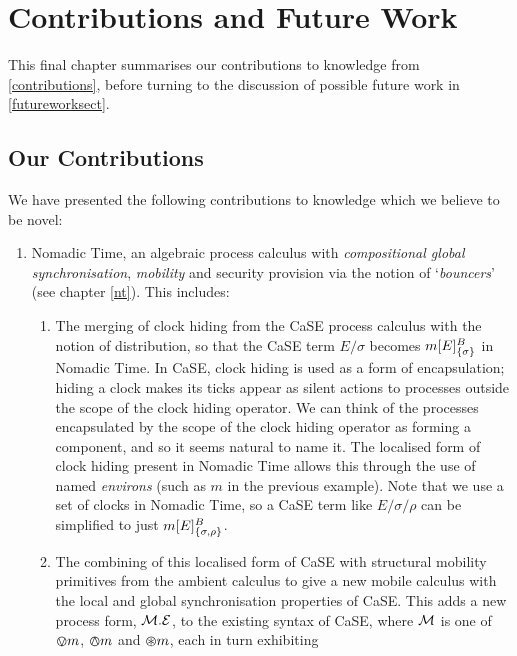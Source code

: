 \chapter{Contributions and Future Work}
\label{futurework}

This final chapter summarises our contributions to knowledge from
\ref{contributions}, before turning to the discussion of possible future
work in \ref{futureworksect}.

\section{Our Contributions}
\label{ourcontributions}

We have presented the following contributions to knowledge which we
believe to be novel:

\begin{enumerate}
\item Nomadic Time, an algebraic process calculus with
  \emph{compositional global synchronisation}, \emph{mobility} and
  security provision via the notion of `\emph{bouncers}' (see chapter
  \ref{nt}).  This includes:
\begin{enumerate}[\bfseries {C1.}1]
\item The merging of clock hiding from the CaSE process calculus
  \cite{CaSE} with the notion of distribution, so that the CaSE term
  $E / \sigma$ becomes ${m}[ E ]^{B}_{\{\sigma\}}$ in Nomadic Time.  In
  CaSE, clock hiding is used as a form of encapsulation; hiding a
  clock makes its ticks appear as silent actions to processes outside
  the scope of the clock hiding operator.  We can think of the
  processes encapsulated by the scope of the clock hiding operator as
  forming a component, and so it seems natural to name it.  The
  localised form of clock hiding present in Nomadic Time allows this
  through the use of named \emph{environs} (such as $m$ in the
  previous example).  Note that we use a set of clocks in Nomadic
  Time, so a CaSE term like $E / \sigma / \rho$ can be simplified to
  just ${m}[ E ]^{B}_{\{\sigma, \rho\}}$.
\item The combining of this localised form of CaSE with structural
  mobility primitives from the ambient calculus \cite{amb} to give a
  new mobile calculus with the local and global synchronisation
  properties of CaSE.  This adds a new process form, $\text{$\mathcal{M}$} . \text{$\mathcal{E}$}$,
  to the existing syntax of CaSE, where $\text{$\mathcal{M}$}$ is one of
  $\varovee m$, $\varowedge m$ and $\varoast m$, each in turn exhibiting

\end{enumerate}
\end{enumerate}
